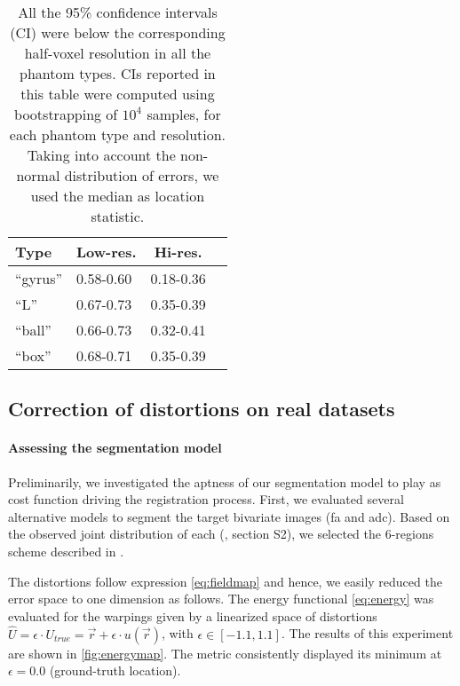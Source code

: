 \begin{table}
		\centering
		\footnotesize
    \begin{tabular}{llcc}
    Type      & Low-res.  & Hi-res. \\
    \hline
    ``gyrus'' & 0.58-0.60 & 0.18-0.36 \\
    ``L''     & 0.67-0.73 & 0.35-0.39 \\
    ``ball''  & 0.66-0.73 & 0.32-0.41 \\
    ``box''   & 0.68-0.71 & 0.35-0.39 \\
    \hline
    \end{tabular}
    \caption{All the 95\% confidence intervals (CI) were below the corresponding
      half-voxel resolution in all the phantom types.
    CIs reported in this table were computed using bootstrapping of $10^4$ samples,
      for each phantom type and resolution.
    Taking into account the non-normal distribution of errors, we used the median as location
  		statistic.}\label{tab:ci_phantom}
\end{table}

\subsection{Correction of distortions on real datasets}\label{sec:results_hcp}

\paragraph*{Assessing the segmentation model}\label{sec:res_model_and_metric} %
%
Preliminarily, we investigated the aptness of our segmentation model to play as cost function
  driving the registration process.
First, we evaluated several alternative models to segment the target bivariate images
  (\gls*{fa} and \gls*{adc}).
Based on the observed joint distribution of each (\suppl{}, {\color{red} section S2}),
  we selected the 6-regions scheme described in .

The distortions follow expression \eqref{eq:fieldmap} and hence, we easily reduced the
  error space to one dimension as follows.
The energy functional \eqref{eq:energy} was evaluated for the warpings given by
  a linearized space of distortions
  $\hat{U} = \epsilon \cdot U_{true} = \vec{r} + \epsilon \cdot u(\vec{r})$,
  with $\epsilon \in [-1.1, 1.1]$.
The results of this experiment are shown in \autoref{fig:energymap}.
The metric consistently displayed its minimum at $\epsilon=0.0$ (ground-truth location).

